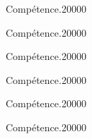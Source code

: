 
\begin{pageParcoursd} %

\begin{ExoCdN}{Compétence.}{2}{0}{0}{0}{0}

\end{ExoCdN}

\begin{ExoCdN}{Compétence.}{2}{0}{0}{0}{0}

\end{ExoCdN}

\begin{ExoCdN}{Compétence.}{2}{0}{0}{0}{0}

\end{ExoCdN}

\begin{ExoCdN}{Compétence.}{2}{0}{0}{0}{0}

\end{ExoCdN}

\begin{ExoCdN}{Compétence.}{2}{0}{0}{0}{0}

\end{ExoCdN}

\begin{ExoCdN}{Compétence.}{2}{0}{0}{0}{0}

\end{ExoCdN}

\end{pageParcoursd} %


